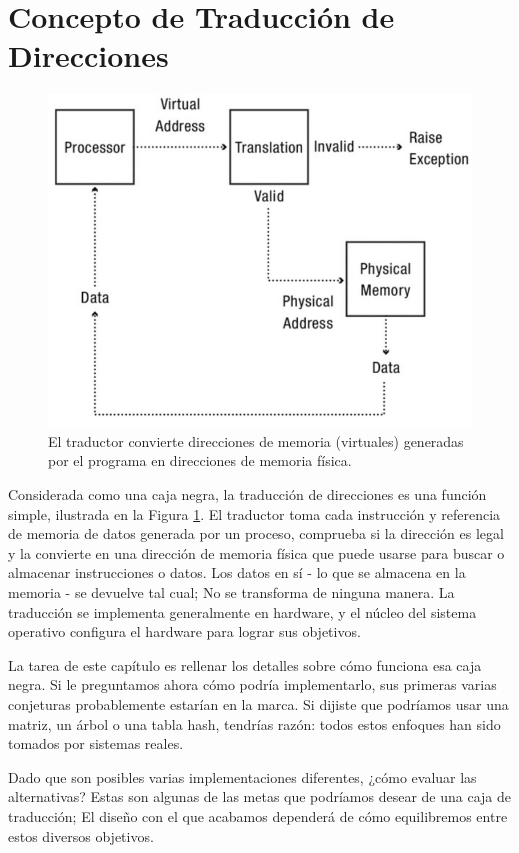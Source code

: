 \documentclass[10pt]{book}
\begin{document}
\section{Concepto de Traducción de Direcciones}
\begin{figure}[tbhp]
\centerline{\includegraphics[scale=0.70]{img/fig0801}}
\caption{El traductor convierte direcciones de memoria (virtuales) generadas por el programa en direcciones de memoria física.}
\label{fig0801}
\end{figure}

Considerada como una caja negra, la traducción de direcciones es una función simple, ilustrada en la Figura \ref{fig0801}. El traductor toma cada instrucción y referencia de memoria de datos generada por un proceso, comprueba si la dirección es legal y la convierte en una dirección de memoria física que puede usarse para buscar o almacenar instrucciones o datos. Los datos en sí - lo que se almacena en la memoria - se devuelve tal cual; No se transforma de ninguna manera. La traducción se implementa generalmente en hardware, y el núcleo del sistema operativo configura el hardware para lograr sus objetivos.

La tarea de este capítulo es rellenar los detalles sobre cómo funciona esa caja negra. Si le preguntamos ahora cómo podría implementarlo, sus primeras varias conjeturas probablemente estarían en la marca. Si dijiste que podríamos usar una matriz, un árbol o una tabla hash, tendrías razón: todos estos enfoques han sido tomados por sistemas reales.

Dado que son posibles varias implementaciones diferentes, ¿cómo evaluar las alternativas? Estas son algunas de las metas que podríamos desear de una caja de traducción; El diseño con el que acabamos dependerá de cómo equilibremos entre estos diversos objetivos.
\end{document}

